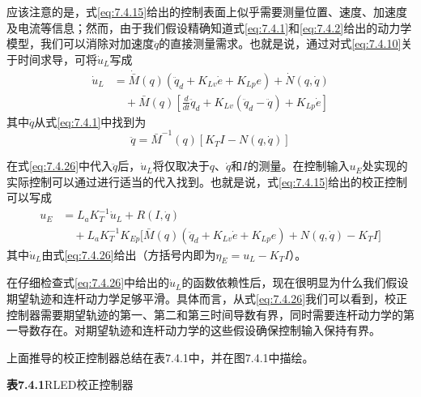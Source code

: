\documentclass[UTF8]{ctexart}
\begin{document}
应该注意的是，式\eqref{eq:7.4.15}给出的控制表面上似乎需要测量位置、速度、加速度及电流等信息；然而，由于我们假设精确知道式\eqref{eq:7.4.1}和\eqref{eq:7.4.2}给出的动力学模型，我们可以消除对加速度$\ddot{q}$的直接测量需求。也就是说，通过对式\eqref{eq:7.4.10}关于时间求导，可将$\dot{u}_L$写成
\begin{equation}\label{eq:7.4.26}
\begin{aligned}
\dot{u}_L &= \dot{\bar{M}}(q)(\ddot{q}_d + K_{Lv}\dot{e} + K_{Lp}e) + \dot{N}(q,\dot{q}) \\
&\quad {} + \bar{M}(q)\left[ \frac{d}{dt}\ddot{q}_d + K_{Lv}(\ddot{q}_d - \ddot{q}) + K_{Lp}\dot{e} \right]
\end{aligned}
\end{equation}
其中$\ddot{q}$从式\eqref{eq:7.4.1}中找到为
\begin{equation*}
\ddot{q} = \bar{M}^{-1}(q)[K_T I - N(q,\dot{q})]
\end{equation*}

在式\eqref{eq:7.4.26}中代入$\ddot{q}$后，$\dot{u}_L$将仅取决于$q$、$\dot{q}$和$I$的测量。在控制输入$u_E$处实现的实际控制可以通过进行适当的代入找到。也就是说，式\eqref{eq:7.4.15}给出的校正控制可以写成
\begin{equation}\label{eq:7.4.27}
\begin{aligned}
u_E &= L_a K_T^{-1}\dot{u}_L + R(I,\dot{q}) \\
&\quad {} + L_a K_T^{-1}K_{Ep}\bigl[ \bar{M}(q)(\ddot{q}_d + K_{Lv}\dot{e} + K_{Lp}e) + N(q,\dot{q}) - K_T I \bigr]
\end{aligned}
\end{equation}
其中$\dot{u}_L$由式\eqref{eq:7.4.26}给出（方括号内即为$\eta_E=u_L-K_TI$）。

在仔细检查式\eqref{eq:7.4.26}中给出的$\dot{u}_L$的函数依赖性后，现在很明显为什么我们假设期望轨迹和连杆动力学足够平滑。具体而言，从式\eqref{eq:7.4.26}我们可以看到，校正控制器需要期望轨迹的第一、第二和第三时间导数有界，同时需要连杆动力学的第一导数存在。对期望轨迹和连杆动力学的这些假设确保控制输入保持有界。

上面推导的校正控制器总结在表7.4.1中，并在图7.4.1中描绘。

\textbf{表7.4.1}\quad RLED校正控制器
\end{document}
